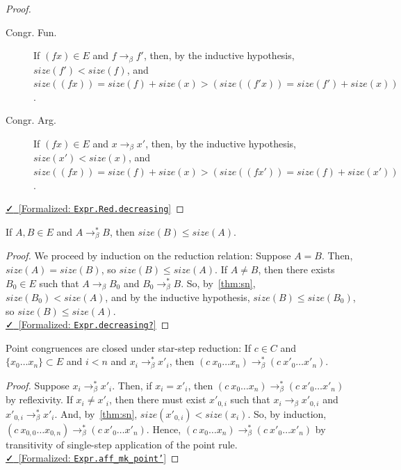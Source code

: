 \documentclass{lmcs}
\newcommand{\leanlink}[2]{
  \href{#1}{\textcolor{black}\faCheck~[Formalized: \texttt{#2}]}%
}
\newcommand{\arr}{\rightarrow}
\newcommand{\barr}{\arr_{\beta}}
\begin{document}
\begin{proof}
\begin{description}
  \item[Congr. Fun.]
  If \((f x) \in E\) and \(f \barr f'\), then, by the inductive hypothesis, \(size(f') < size(f)\), and \(size((f x)) = size(f) + size(x) > (size((f' x)) = size(f') + size(x))\).
  \item[Congr. Arg.]
  If \((f x) \in E\) and \(x \barr x'\), then, by the inductive hypothesis, \(size(x') < size(x)\), and \(size((f x)) = size(f) + size(x) > (size((f x')) = size(f) + size(x'))\).\\
\end{description}
\noindent \leanlink{https://github.com/lexzaiello/DCC/blob/fb7acf6d9644df7d13c809d12609b59eaca5c763/Dcc/Red/Rel.lean\#L82}{Expr.Red.decreasing}
\end{proof}

\begin{lem}\label{lem:decstar}
  If \(A, B \in E\) and \(A \barr^{*} B\), then \(size(B) \le size(A)\).
\end{lem}

\begin{proof}
  We proceed by induction on the reduction relation: Suppose \(A = B\). Then, \(size(A) = size(B)\), so \(size(B) \le size(A)\). If \(A \neq B\), then there exists \(B_0 \in E\) such that \(A \barr B_0\) and \(B_0 \barr^{*} B\). So, by~\ref{thm:sn}, \(size(B_0) < size(A)\), and by the inductive hypothesis, \(size(B) \le size(B_0)\), so \(size(B) \le size(A)\).\\
  \noindent \leanlink{https://github.com/lexzaiello/DCC/blob/fb7acf6d9644df7d13c809d12609b59eaca5c763/Dcc/Red/RelationProp.lean\#L507}{Expr.decreasing?}
\end{proof}

\begin{lem}\label{lem:pointstar}
  Point congruences are closed under star-step reduction: If \(c \in C\) and \(\{x_0 \ldots x_n\} \subset E\) and \(i < n\) and \(x_i \barr^{*} x'_i\), then \((c\ x_0 \ldots x_n) \barr^{*} (c\ x'_0 \ldots x'_n)\).
\end{lem}

\begin{proof}
  Suppose \(x_i \barr^{*} x'_i\). Then, if \(x_i = x'_i\), then \((c\ x_0 \ldots x_n) \barr^{*} (c\ x'_0 \ldots x'_n)\) by reflexivity. If \(x_i \neq x'_i\), then there must exist \(x'_{0,i}\) such that \(x_i \barr x'_{0,i}\) and \(x'_{0,i} \barr^{*} x'_{i}\). And, by~\ref{thm:sn}, \(size(x'_{0,i}) < size(x_i)\). So, by induction, \((c\ x_{0,0} \ldots x_{0,n}) \barr^{*} (c\ x'_0 \ldots x'_n)\). Hence, \((c\ x_0 \ldots x_n) \barr^{*} (c\ x'_0 \ldots x'_n)\) by transitivity of single-step application of the point rule.\\
  \noindent \leanlink{https://github.com/lexzaiello/DCC/blob/fb7acf6d9644df7d13c809d12609b59eaca5c763/Dcc/Red/Run.lean\#L307}{Expr.aff\_mk\_point'}
\end{proof}
\end{document}
